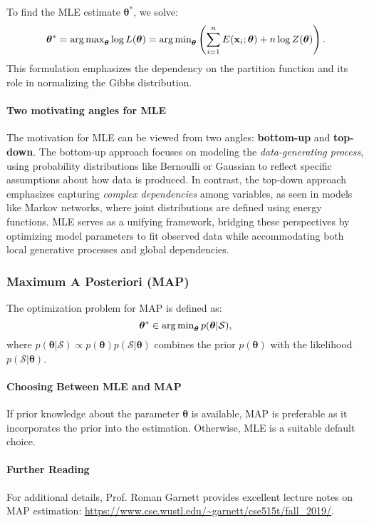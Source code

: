 To find the MLE estimate $\bm{\theta}^\ast$, we solve:
\[
\bm{\theta}^\ast = \operatorname{arg\,max}_{\bm{\theta}} \log L(\bm{\theta}) = \operatorname{arg\,min}_{\bm{\theta}} \left(\sum_{i=1}^n E(\mathbf{x}_i; \bm{\theta}) + n \log Z(\bm{\theta})\right).
\]
This formulation emphasizes the dependency on the partition function and its role in normalizing the Gibbs distribution.


\paragraph{Two motivating angles for MLE} The motivation for MLE can be viewed from two angles: \textbf{bottom-up} and \textbf{top-down}. The bottom-up approach focuses on modeling the \textit{data-generating process}, using probability distributions like Bernoulli or Gaussian to reflect specific assumptions about how data is produced. In contrast, the top-down approach emphasizes capturing \textit{complex dependencies} among variables, as seen in models like Markov networks, where joint distributions are defined using energy functions. MLE serves as a unifying framework, bridging these perspectives by optimizing model parameters to fit observed data while accommodating both local generative processes and global dependencies.


\subsubsection{Maximum A Posteriori (MAP)}
The optimization problem for MAP is defined as:
\[
\bm{\theta}^\ast \in \operatorname{arg\,min}_{\bm{\theta}} p(\bm{\theta} | \mathcal{S}),
\]
where $p(\bm{\theta} | \mathcal{S}) \propto p(\bm{\theta}) p(\mathcal{S} | \bm{\theta})$ combines the prior $p(\bm{\theta})$ with the likelihood $p(\mathcal{S} | \bm{\theta})$.

\paragraph{Choosing Between MLE and MAP}
If prior knowledge about the parameter $\bm{\theta}$ is available, MAP is preferable as it incorporates the prior into the estimation. Otherwise, MLE is a suitable default choice.

\paragraph{Further Reading}
For additional details, Prof. Roman Garnett provides excellent lecture notes on MAP estimation:
\url{https://www.cse.wustl.edu/~garnett/cse515t/fall_2019/}.

